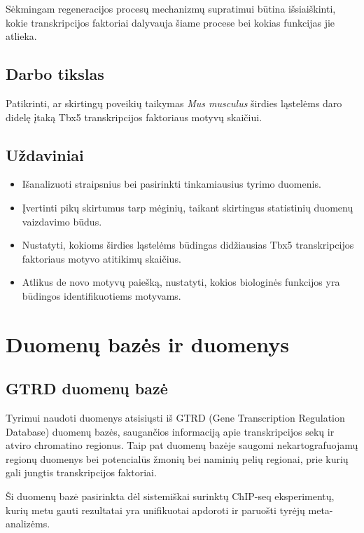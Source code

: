 \documentclass[12pt]{article}
\begin{document}
Sėkmingam regeneracijos procesų mechanizmų supratimui būtina išsiaiškinti, 
kokie transkripcijos faktoriai dalyvauja šiame procese bei kokias funkcijas jie
atlieka.

\subsection*{Darbo tikslas}

Patikrinti, ar skirtingų poveikių taikymas \emph{Mus musculus} širdies
ląstelėms daro didelę įtaką Tbx5 transkripcijos faktoriaus motyvų skaičiui.

\subsection*{Uždaviniai}
\begin{itemize}
    \item Išanalizuoti straipsnius bei pasirinkti tinkamiausius tyrimo duomenis.
    \item Įvertinti pikų skirtumus tarp mėginių, taikant skirtingus statistinių
        duomenų vaizdavimo būdus.
    \item Nustatyti, kokioms širdies ląstelėms būdingas didžiausias Tbx5
        transkripcijos faktoriaus motyvo atitikimų skaičius.
    \item Atlikus de novo motyvų paiešką, nustatyti, kokios biologinės
        funkcijos yra būdingos identifikuotiems motyvams.
\end{itemize}

\newpage


\section{Duomenų bazės ir duomenys}
\subsection{GTRD duomenų bazė}
Tyrimui naudoti duomenys atsisiųsti iš GTRD (Gene Transcription Regulation
Database)\cite{GTRD} duomenų bazės, saugančios informaciją apie transkripcijos
sekų ir atviro chromatino regionus. Taip pat duomenų bazėje saugomi
nekartografuojamų regionų duomenys bei potencialūs žmonių bei naminių pelių
regionai, prie kurių gali jungtis transkripcijos faktoriai.

Ši duomenų bazė pasirinkta dėl sistemiškai surinktų ChIP-seq eksperimentų,
kurių metu gauti rezultatai yra unifikuotai apdoroti ir paruošti tyrėjų
meta-analizėms.
\end{document}
